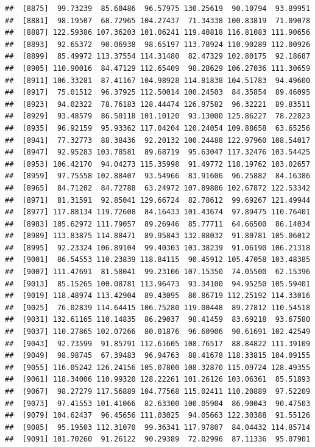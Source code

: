 \documentclass[
]{article}
\begin{document}
\begin{verbatim}
##  [8875]  99.73239  85.60486  96.57975 130.25619  90.10794  93.89951
##  [8881]  98.19507  68.72965 104.27437  71.34338 100.83819  71.09078
##  [8887] 122.59386 107.36203 101.06241 119.40818 116.81083 111.90656
##  [8893]  92.65372  90.06938  98.65197 113.78924 110.90289 112.00926
##  [8899]  85.49972 113.37554 114.31480  82.47329 102.80175  92.18687
##  [8905] 110.90016  84.47129 112.65409  98.28629 106.27036 111.30659
##  [8911] 106.33281  87.41167 104.98928 114.81838 104.51783  94.49600
##  [8917]  75.01512  96.37925 112.50014 100.24503  84.35854  89.46095
##  [8923]  94.02322  78.76183 128.44474 126.97582  96.32221  89.83511
##  [8929]  93.48579  86.50118 101.10120  93.13000 125.86227  78.22823
##  [8935]  96.92159  95.93362 117.04204 120.24054 109.88658  63.65256
##  [8941]  77.32773  88.38436  92.20132 100.24488 122.97960 108.54017
##  [8947]  92.95283 103.78581  89.68719  95.63047 117.32476 103.54425
##  [8953] 106.42170  94.04273 115.35998  91.49772 118.19762 103.02657
##  [8959]  97.75558 102.88407  93.54966  83.91606  96.25882  84.16386
##  [8965]  84.71202  84.72788  63.24972 107.89886 102.67872 122.53342
##  [8971]  81.31591  92.85041 129.66724  82.78612  99.69267 121.49944
##  [8977] 117.88134 119.72608  84.16433 101.43674  97.89475 110.76401
##  [8983] 105.62972 111.79057  89.26946  85.77711  64.66500  86.14034
##  [8989] 113.83875 114.88471  89.95843 132.88032  91.80781 105.06012
##  [8995]  92.23324 106.89104  99.40303 103.38239  91.06190 106.21318
##  [9001]  86.54553 110.23839 118.84115  90.45912 105.47058 103.48385
##  [9007] 111.47691  81.58041  99.23106 107.15350  74.05500  62.15396
##  [9013]  85.15265 100.08781 113.96473  93.34100  94.95250 105.59401
##  [9019] 118.48974 113.42904  89.43095  80.86719 112.25192 114.33016
##  [9025]  76.02839 114.64415 106.75280 119.00448  89.27812 110.54518
##  [9031] 132.61165 110.14835  86.29037  98.41459  83.69218  93.67580
##  [9037] 110.27865 102.07266  80.01876  96.60906  90.61691 102.42549
##  [9043]  92.73599  91.85791 112.61605 108.76517  88.84822 111.39109
##  [9049]  98.98745  67.39483  96.94763  88.41678 118.33815 104.09155
##  [9055] 116.05242 126.24156 105.07800 108.32870 115.09724 128.49355
##  [9061] 118.34006 110.99320 128.22261 101.26126 103.06361  85.51893
##  [9067]  98.27279 117.56889 104.77568 115.02411 110.20889  97.52209
##  [9073]  97.41553 101.41066  82.63300 100.05904  86.90043  90.47503
##  [9079] 104.62437  96.45656 111.03025  94.05663 122.30388  91.55126
##  [9085]  95.19503 112.31070  99.36341 117.97807  84.04432 114.85714
##  [9091] 101.70260  91.26122  90.29389  72.02996  87.11336  95.07901

\end{verbatim}
\end{document}
